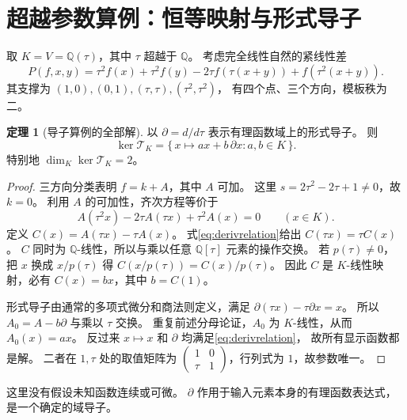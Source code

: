 \documentclass[UTF8,11pt,a4paper]{ctexart}
\theoremstyle{definition}
\newtheorem{theorem}{定理}[section]
\newcommand{\Q}{\mathbb Q}
\newcommand{\T}{\mathcal T}
\numberwithin{equation}{section}
\begin{document}
\section{超越参数算例：恒等映射与形式导子}\label{sec:derivexample}
取 $K=V=\Q(\tau)$，其中 $\tau$ 超越于 $\Q$。
考虑完全线性自然的紧线性差
\begin{equation}\label{eq:derivoperator}
 P(f,x,y)=
 \tau^2f(x)+\tau^2f(y)
 -2\tau f(\tau(x+y))+f(\tau^2(x+y)).
\end{equation}
其支撑为 $(1,0),(0,1),(\tau,\tau),(\tau^2,\tau^2)$，
有四个点、三个方向，模板秩为二。

\begin{theorem}[导子算例的全部解]\label{thm:derivkernel}
以 $\partial=d/d\tau$ 表示有理函数域上的形式导子。
则
\[
 \ker\T_K=\{\,x\mapsto ax+b\,\partial x:a,b\in K\,\}.
\]
特别地 $\dim_K\ker\T_K=2$。
\end{theorem}
\begin{proof}
三方向分类表明 $f=k+A$，其中 $A$ 可加。
这里
$s=2\tau^2-2\tau+1\ne0$，故 $k=0$。
利用 $A$ 的可加性，齐次方程等价于
\begin{equation}\label{eq:derivrelation}
 A(\tau^2x)-2\tau A(\tau x)+\tau^2A(x)=0
 \qquad(x\in K).
\end{equation}
定义 $C(x)=A(\tau x)-\tau A(x)$。
式\eqref{eq:derivrelation}给出 $C(\tau x)=\tau C(x)$。
$C$ 同时为 $\Q$-线性，所以与乘以任意 $\Q[\tau]$ 元素的操作交换。
若 $p(\tau)\ne0$，把 $x$ 换成 $x/p(\tau)$ 得
$C(x/p(\tau))=C(x)/p(\tau)$。
因此 $C$ 是 $K$-线性映射，必有 $C(x)=bx$，其中 $b=C(1)$。

形式导子由通常的多项式微分和商法则定义，满足
$\partial(\tau x)-\tau\partial x=x$。
所以 $A_0=A-b\partial$ 与乘以 $\tau$ 交换。
重复前述分母论证，$A_0$ 为 $K$-线性，从而 $A_0(x)=ax$。
反过来 $x\mapsto x$ 和 $\partial$ 均满足\eqref{eq:derivrelation}，
故所有显示函数都是解。
二者在 $1,\tau$ 处的取值矩阵为
$\begin{pmatrix}1&0\\ \tau&1\end{pmatrix}$，行列式为 $1$，故参数唯一。
\end{proof}

这里没有假设未知函数连续或可微。
$\partial$ 作用于输入元素本身的有理函数表达式，是一个确定的域导子。
\end{document}
